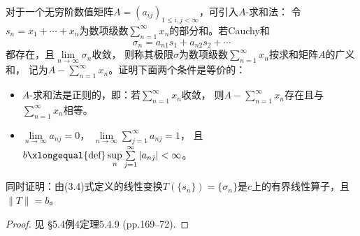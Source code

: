 \begin{25}[Toeplitz]
    对于一个无穷阶数值矩阵$A=(a_{ij})_{1 \leqslant i,j < \infty}$，可引入$A$-求和法：
    令$s_n=x_1+\cdots+x_n$为数项级数$\sum\limits_{n=1}^\infty x_n$的部分和。若Cauchy和
    \[\sigma_n=a_{n1}s_1+a_{n2}s_2+\cdots\tag{3.4}\]
    都存在，且$\lim\limits_{n\to\infty}\sigma_n$收敛，
    则称其极限$\sigma$为数项级数$\sum\limits_{n=1}^\infty x_n$按求和矩阵$A$的广义和，
    记为$A-\sum\limits_{n=1}^\infty x_n$。证明下面两个条件是等价的：
    \begin{itemize}
        \item[(i)] $A$-求和法是正则的，即：若$\sum\limits_{n=1}^\infty x_n$收敛，
        则$A-\sum\limits_{n=1}^\infty x_n$存在且与$\sum\limits_{n=1}^\infty x_n$相等。
        \item[(ii)] $\lim\limits_{n\to\infty}a_{nj}=0$，
        $\lim\limits_{n\to\infty}\sum\limits_{j=1}^\infty a_{nj}=1$，
        且$b\xlongequal{\text{def}}\sup\limits_n\sum\limits_{j=1}^\infty|a_{nj}|<\infty$。
    \end{itemize}
    同时证明：由(3.4)式定义的线性变换$T(\{s_n\})=\{\sigma_n\}$是$c$上的有界线性算子，且$\|T\|=b$。
\end{25}
\begin{proof}
    见\cite{Xia} \S5.4例4定理5.4.9 (pp.169--72).
\end{proof}

